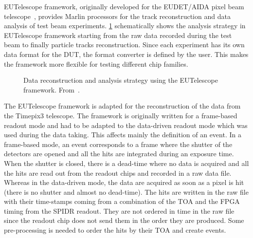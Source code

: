 EUTelescope framework, originally developed for the EUDET/AIDA pixel
beam telescope~\cite{Rubinskiy:2014kza}, provides Marlin processors
for the track reconstruction and data analysis of test beam
experiments. \cref{fig:EUTelescope_EUDET_pipeline} schematically shows
the analysis strategy in EUTelescope framework starting from the raw
data recorded during the test beam to finally particle tracks
reconstruction. Since each experiment has its own data format for the
DUT, the format converter is defined by the user. This makes the
framework more flexible for testing different chip families.

\begin{figure}[htbp]
  \centering
  \caption{Data reconstruction and analysis strategy using the
    EUTelescope framework. From~\cite{Jansen:2016bkd}.}
  \label{fig:EUTelescope_EUDET_pipeline}
\end{figure}

The EUTelescope framework is adapted for the reconstruction of the
data from the Timepix3 telescope. The framework is originally written
for a frame-based readout mode and had to be adapted to the
data-driven readout mode which was used during the data taking. This
affects mainly the definition of an event. In a frame-based mode, an
event corresponds to a frame where the shutter of the detectors are
opened and all the hits are integrated during an exposure time. When
the shutter is closed, there is a dead-time where no data is acquired
and all the hits are read out from the readout chips and recorded in a
raw data file. Whereas in the data-driven mode, the data are acquired
as soon as a pixel is hit (there is no shutter and almost no
dead-time). The hits are written in the raw file with their
time-stamps coming from a combination of the TOA and the FPGA timing
from the SPIDR readout. They are not ordered in time in the raw file
since the readout chip does not send them in the order they are
produced. Some pre-processing is needed to order the hits by their TOA
and create events.

